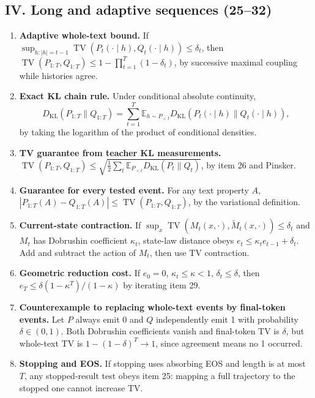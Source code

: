 \documentclass[11pt,a4paper,oneside]{book}
\begin{document}
\subsection*{IV. Long and adaptive sequences (25--32)}
\begin{enumerate}[start=25]
\item \textbf{Adaptive whole-text bound.} If $\sup_{h:|h|=t-1}\operatorname{TV}(P_t(\cdot\mid h),Q_t(\cdot\mid h))\le\delta_t$, then $\operatorname{TV}(P_{1:T},Q_{1:T})\le1-\prod_{t=1}^T(1-\delta_t)$, by successive maximal coupling while histories agree.
\item \textbf{Exact KL chain rule.} Under conditional absolute continuity,
\[D_{\mathrm{KL}}(P_{1:T}\|Q_{1:T})=\sum_{t=1}^T\mathbb E_{h\sim P_{<t}}D_{\mathrm{KL}}(P_t(\cdot\mid h)\|Q_t(\cdot\mid h)),\]
by taking the logarithm of the product of conditional densities.
\item \textbf{TV guarantee from teacher KL measurements.} $\operatorname{TV}(P_{1:T},Q_{1:T})\le\sqrt{\frac12\sum_t\mathbb E_{P_{<t}}D_{\mathrm{KL}}(P_t\|Q_t)}$, by item 26 and Pinsker.
\item \textbf{Guarantee for every tested event.} For any text property $A$, $|P_{1:T}(A)-Q_{1:T}(A)|\le\operatorname{TV}(P_{1:T},Q_{1:T})$, by the variational definition.
\item \textbf{Current-state contraction.} If $\sup_x\operatorname{TV}(M_t(x,\cdot),\widetilde M_t(x,\cdot))\le\delta_t$ and $M_t$ has Dobrushin coefficient $\kappa_t$, state-law distance obeys $e_t\le\kappa_te_{t-1}+\delta_t$. Add and subtract the action of $M_t$, then use TV contraction.
\item \textbf{Geometric reduction cost.} If $e_0=0$, $\kappa_t\le\kappa<1$, $\delta_t\le\delta$, then $e_T\le\delta(1-\kappa^T)/(1-\kappa)$ by iterating item 29.
\item \textbf{Counterexample to replacing whole-text events by final-token events.} Let $P$ always emit 0 and $Q$ independently emit 1 with probability $\delta\in(0,1)$. Both Dobrushin coefficients vanish and final-token TV is $\delta$, but whole-text TV is $1-(1-\delta)^T\to1$, since agreement means no 1 occurred.
\item \textbf{Stopping and EOS.} If stopping uses absorbing EOS and length is at most $T$, any stopped-result test obeys item 25: mapping a full trajectory to the stopped one cannot increase TV.
\end{enumerate}
\end{document}
